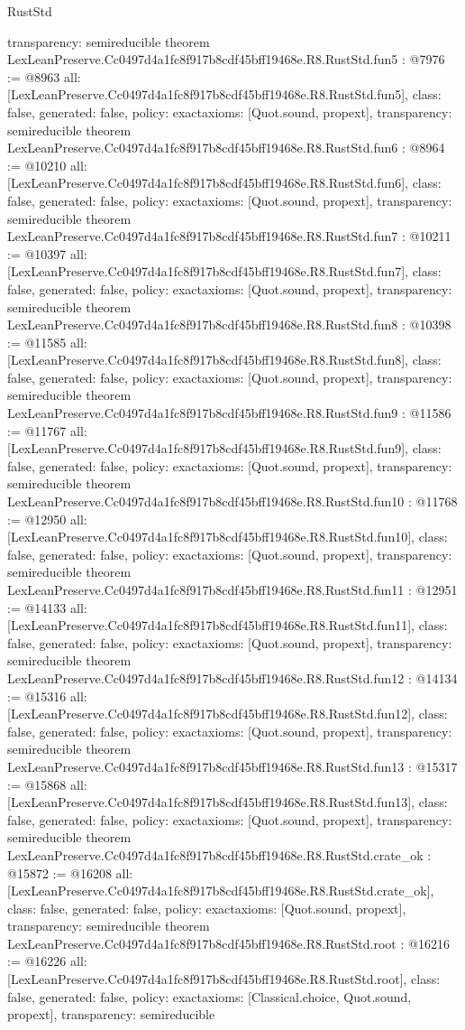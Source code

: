 \begin{lexlean}{RustStd}
\begin{coremodule}
{  transparency: semireducible
}
theorem LexLeanPreserve.Cc0497d4a1fc8f917b8cdf45bff19468e.R8.RustStd.fun5 : @7976 := @8963 {
  all: [LexLeanPreserve.Cc0497d4a1fc8f917b8cdf45bff19468e.R8.RustStd.fun5],
  class: false,
  generated: false,
  policy: exact{axioms: [Quot.sound, propext]},
  transparency: semireducible
}
theorem LexLeanPreserve.Cc0497d4a1fc8f917b8cdf45bff19468e.R8.RustStd.fun6 : @8964 := @10210 {
  all: [LexLeanPreserve.Cc0497d4a1fc8f917b8cdf45bff19468e.R8.RustStd.fun6],
  class: false,
  generated: false,
  policy: exact{axioms: [Quot.sound, propext]},
  transparency: semireducible
}
theorem LexLeanPreserve.Cc0497d4a1fc8f917b8cdf45bff19468e.R8.RustStd.fun7 : @10211 := @10397 {
  all: [LexLeanPreserve.Cc0497d4a1fc8f917b8cdf45bff19468e.R8.RustStd.fun7],
  class: false,
  generated: false,
  policy: exact{axioms: [Quot.sound, propext]},
  transparency: semireducible
}
theorem LexLeanPreserve.Cc0497d4a1fc8f917b8cdf45bff19468e.R8.RustStd.fun8 : @10398 := @11585 {
  all: [LexLeanPreserve.Cc0497d4a1fc8f917b8cdf45bff19468e.R8.RustStd.fun8],
  class: false,
  generated: false,
  policy: exact{axioms: [Quot.sound, propext]},
  transparency: semireducible
}
theorem LexLeanPreserve.Cc0497d4a1fc8f917b8cdf45bff19468e.R8.RustStd.fun9 : @11586 := @11767 {
  all: [LexLeanPreserve.Cc0497d4a1fc8f917b8cdf45bff19468e.R8.RustStd.fun9],
  class: false,
  generated: false,
  policy: exact{axioms: [Quot.sound, propext]},
  transparency: semireducible
}
theorem LexLeanPreserve.Cc0497d4a1fc8f917b8cdf45bff19468e.R8.RustStd.fun10 : @11768 := @12950 {
  all: [LexLeanPreserve.Cc0497d4a1fc8f917b8cdf45bff19468e.R8.RustStd.fun10],
  class: false,
  generated: false,
  policy: exact{axioms: [Quot.sound, propext]},
  transparency: semireducible
}
theorem LexLeanPreserve.Cc0497d4a1fc8f917b8cdf45bff19468e.R8.RustStd.fun11 : @12951 := @14133 {
  all: [LexLeanPreserve.Cc0497d4a1fc8f917b8cdf45bff19468e.R8.RustStd.fun11],
  class: false,
  generated: false,
  policy: exact{axioms: [Quot.sound, propext]},
  transparency: semireducible
}
theorem LexLeanPreserve.Cc0497d4a1fc8f917b8cdf45bff19468e.R8.RustStd.fun12 : @14134 := @15316 {
  all: [LexLeanPreserve.Cc0497d4a1fc8f917b8cdf45bff19468e.R8.RustStd.fun12],
  class: false,
  generated: false,
  policy: exact{axioms: [Quot.sound, propext]},
  transparency: semireducible
}
theorem LexLeanPreserve.Cc0497d4a1fc8f917b8cdf45bff19468e.R8.RustStd.fun13 : @15317 := @15868 {
  all: [LexLeanPreserve.Cc0497d4a1fc8f917b8cdf45bff19468e.R8.RustStd.fun13],
  class: false,
  generated: false,
  policy: exact{axioms: [Quot.sound, propext]},
  transparency: semireducible
}
theorem LexLeanPreserve.Cc0497d4a1fc8f917b8cdf45bff19468e.R8.RustStd.crate_ok : @15872 := @16208 {
  all: [LexLeanPreserve.Cc0497d4a1fc8f917b8cdf45bff19468e.R8.RustStd.crate_ok],
  class: false,
  generated: false,
  policy: exact{axioms: [Quot.sound, propext]},
  transparency: semireducible
}
theorem LexLeanPreserve.Cc0497d4a1fc8f917b8cdf45bff19468e.R8.RustStd.root : @16216 := @16226 {
  all: [LexLeanPreserve.Cc0497d4a1fc8f917b8cdf45bff19468e.R8.RustStd.root],
  class: false,
  generated: false,
  policy: exact{axioms: [Classical.choice, Quot.sound, propext]},
  transparency: semireducible
}


\end{coremodule}
\end{lexlean}
